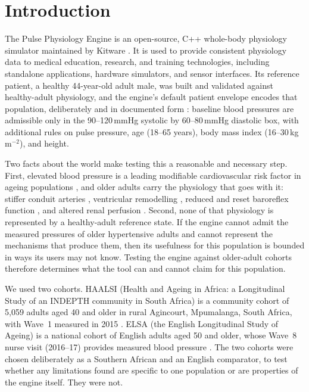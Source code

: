 \documentclass[preprint,12pt,nopreprintline]{elsarticle}
\begin{document}
\section{Introduction}

The Pulse Physiology Engine is an open-source, C++ whole-body physiology simulator maintained by Kitware \cite{pulse,bray2019}. It is used to provide consistent physiology data to medical education, research, and training technologies, including standalone applications, hardware simulators, and sensor interfaces. Its reference patient, a healthy 44-year-old adult male, was built and validated against healthy-adult physiology, and the engine's default patient envelope encodes that population, deliberately and in documented form \cite{pulsepatient}: baseline blood pressures are admissible only in the 90--120\,mmHg systolic by 60--80\,mmHg diastolic box, with additional rules on pulse pressure, age (18--65 years), body mass index (16--30\,kg\,m$^{-2}$), and height.

Two facts about the world make testing this a reasonable and necessary step. First, elevated blood pressure is a leading modifiable cardiovascular risk factor in ageing populations \cite{gbd2019}, and older adults carry the physiology that goes with it: stiffer conduit arteries \cite{mitchell2004}, ventricular remodelling \cite{ganau1992}, reduced and reset baroreflex function \cite{bristow1969,james1996,xie1991}, and altered renal perfusion \cite{schmieder1994}. Second, none of that physiology is represented by a healthy-adult reference state. If the engine cannot admit the measured pressures of older hypertensive adults and cannot represent the mechanisms that produce them, then its usefulness for this population is bounded in ways its users may not know. Testing the engine against older-adult cohorts therefore determines what the tool can and cannot claim for this population.

We used two cohorts. HAALSI (Health and Ageing in Africa: a Longitudinal Study of an INDEPTH community in South Africa) is a community cohort of 5{,}059 adults aged 40 and older in rural Agincourt, Mpumalanga, South Africa, with Wave~1 measured in 2015 \cite{haalsi}. ELSA (the English Longitudinal Study of Ageing) is a national cohort of English adults aged 50 and older, whose Wave~8 nurse visit (2016--17) provides measured blood pressure \cite{elsa}. The two cohorts were chosen deliberately as a Southern African and an English comparator, to test whether any limitations found are specific to one population or are properties of the engine itself. They were not.
\end{document}
